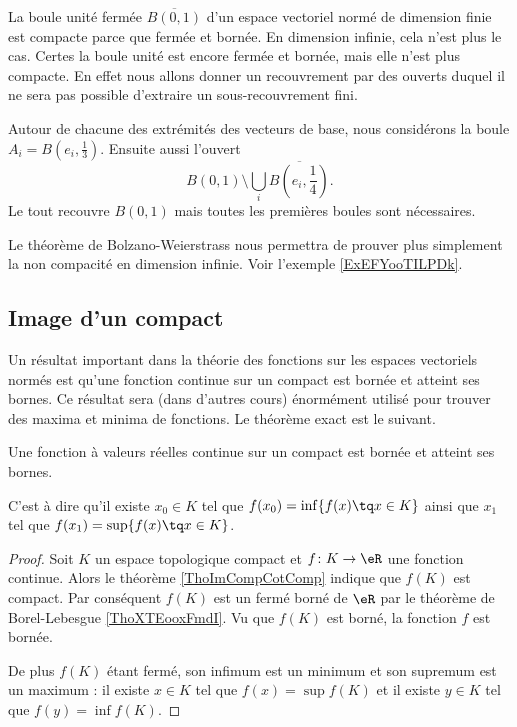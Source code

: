 \begin{example}
    La boule unité fermée \( \overline{ B(0,1) }\) d'un espace vectoriel normé de dimension finie est compacte parce que fermée et bornée. En dimension infinie, cela n'est plus le cas. Certes la boule unité est encore fermée et bornée, mais elle n'est plus compacte. En effet nous allons donner un recouvrement par des ouverts duquel il ne sera pas possible d'extraire un sous-recouvrement fini.
    
    Autour de chacune des extrémités des vecteurs de base, nous considérons la boule \( A_i=B(e_i,\frac{1}{ 3 })\). Ensuite aussi l'ouvert
    \begin{equation}
        B(0,1)\setminus\bigcup_i\overline{ B(e_i,\frac{1}{ 4 })}.
    \end{equation}
    Le tout recouvre \( B(0,1)\) mais toutes les premières boules sont nécessaires.
\end{example}
Le théorème de Bolzano-Weierstrass nous permettra de prouver plus simplement la non compacité en dimension infinie. Voir l'exemple \ref{ExEFYooTILPDk}.

\subsection{Image d'un compact}
Un résultat important dans la théorie des fonctions sur les espaces vectoriels normés est qu'une fonction continue sur un compact est bornée et atteint ses bornes. Ce résultat sera (dans d'autres cours) énormément utilisé pour trouver des maxima et minima de fonctions. Le théorème exact est le suivant.

\begin{theorem}\label{ThoMKKooAbHaro}
    Une fonction à valeurs réelles continue sur un compact est bornée et atteint ses bornes.


	C'est à dire qu'il existe $x_0\in K$ tel que $f(x_0)=\inf\{ f(x)\tq x\in K \}$ ainsi que $x_1$ tel que $f(x_1)=\sup\{ f(x)\tq x\in K \}$.
\end{theorem}

\begin{proof}
    Soit \( K\) un espace topologique compact et \( f\colon K\to \eR\) une fonction continue. Alors le théorème \ref{ThoImCompCotComp} indique que \( f(K)\) est compact. Par conséquent \( f(K)\) est un fermé borné de \( \eR\) par le théorème de Borel-Lebesgue \ref{ThoXTEooxFmdI}. Vu que \( f(K)\) est borné, la fonction \( f\) est bornée.

    De plus \( f(K)\) étant fermé, son infimum est un minimum et son supremum est un maximum : il existe \( x\in K\) tel que \( f(x)=\sup f(K)\) et il existe \( y\in K\) tel que \( f(y)=\inf f(K)\).
\end{proof}

